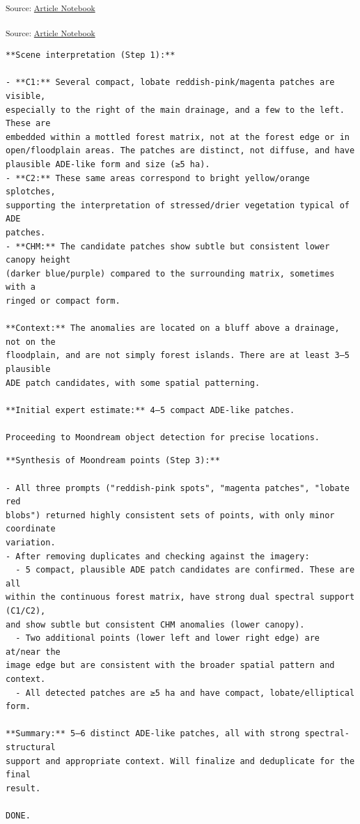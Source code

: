 \documentclass[
  letterpaper,
  DIV=11,
  numbers=noendperiod]{scrartcl}
\makeatletter
\newcommand*\pandocbounded[1]{%
  \sbox\pandoc@box{#1}%
  \Gscale@div\@tempa{\textheight}{\dimexpr\ht\pandoc@box+\dp\pandoc@box\relax}%
  \Gscale@div\@tempb{\linewidth}{\wd\pandoc@box}%
  \ifdim\@tempb\p@<\@tempa\p@\let\@tempa\@tempb\fi%
  \ifdim\@tempa\p@<\p@\scalebox{\@tempa}{\usebox\pandoc@box}%
  \else\usebox{\pandoc@box}%
  \fi%
}
\makeatother
\begin{document}
\textsubscript{Source:
\href{https://nick-gauthier.github.io/itenez-forest-gardens/index-preview.html}{Article
Notebook}}

\pandocbounded{\texttt{[image: index\_files/figure-pdf/unnamed-chunk-5-1.pdf]}}

\textsubscript{Source:
\href{https://nick-gauthier.github.io/itenez-forest-gardens/index-preview.html}{Article
Notebook}}

\begin{verbatim}
**Scene interpretation (Step 1):**

- **C1:** Several compact, lobate reddish-pink/magenta patches are visible, 
especially to the right of the main drainage, and a few to the left. These are 
embedded within a mottled forest matrix, not at the forest edge or in 
open/floodplain areas. The patches are distinct, not diffuse, and have 
plausible ADE-like form and size (≥5 ha).
- **C2:** These same areas correspond to bright yellow/orange splotches, 
supporting the interpretation of stressed/drier vegetation typical of ADE 
patches.
- **CHM:** The candidate patches show subtle but consistent lower canopy height
(darker blue/purple) compared to the surrounding matrix, sometimes with a 
ringed or compact form.

**Context:** The anomalies are located on a bluff above a drainage, not on the 
floodplain, and are not simply forest islands. There are at least 3–5 plausible
ADE patch candidates, with some spatial patterning.

**Initial expert estimate:** 4–5 compact ADE-like patches.

Proceeding to Moondream object detection for precise locations.
\end{verbatim}

\begin{verbatim}
**Synthesis of Moondream points (Step 3):**

- All three prompts ("reddish-pink spots", "magenta patches", "lobate red 
blobs") returned highly consistent sets of points, with only minor coordinate 
variation.
- After removing duplicates and checking against the imagery:
  - 5 compact, plausible ADE patch candidates are confirmed. These are all 
within the continuous forest matrix, have strong dual spectral support (C1/C2),
and show subtle but consistent CHM anomalies (lower canopy).
  - Two additional points (lower left and lower right edge) are at/near the 
image edge but are consistent with the broader spatial pattern and context.
  - All detected patches are ≥5 ha and have compact, lobate/elliptical form.

**Summary:** 5–6 distinct ADE-like patches, all with strong spectral-structural
support and appropriate context. Will finalize and deduplicate for the final 
result.

DONE.
\end{verbatim}
\end{document}

